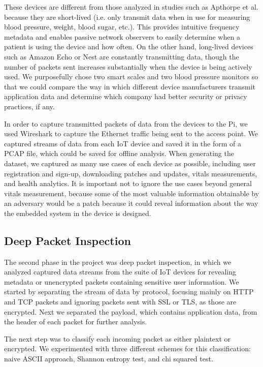 These devices are different from those analyzed in studies such as Apthorpe et al. because they are short-lived (i.e. only transmit data when in use for measuring blood pressure, weight, blood sugar, etc.). This provides intuitive frequency metadata and enables passive network observers to easily determine when a patient is using the device and how often. On the other hand, long-lived devices such as Amazon Echo or Nest are constantly transmitting data, though the number of packets sent increases substantially when the device is being actively used. We purposefully chose two smart scales and two blood pressure monitors so that we could compare the way in which different device manufacturers transmit application data and determine which company had better security or privacy practices, if any. 

In order to capture transmitted packets of data from the devices to the Pi, we used Wireshark to capture the Ethernet traffic being sent to the access point. We captured streams of data from each IoT device and saved it in the form of a PCAP file, which could be saved for offline analysis. When generating the dataset, we captured as many use cases of each device as possible, including user registration and sign-up, downloading patches and updates, vitals measurements, and health analytics. It is important not to ignore the use cases beyond general vitals measurement, because some of the most valuable information obtainable by an adversary would be a patch because it could reveal information about the way the embedded system in the device is designed. 

\subsection{Deep Packet Inspection}

The second phase in the project was deep packet inspection, in which we analyzed captured data streams from the suite of IoT devices for revealing metadata or unencrypted packets containing sensitive user information. We started by separating the stream of data by protocol, focusing mainly on HTTP and TCP packets and ignoring packets sent with SSL or TLS, as those are encrypted. Next we separated the payload, which contains application data, from the header of each packet for further analysis. 

The next step was to classify each incoming packet as either plaintext or encrypted. We experimented with three different schemes for this classification: naive ASCII approach, Shannon entropy test, and chi squared test. 

